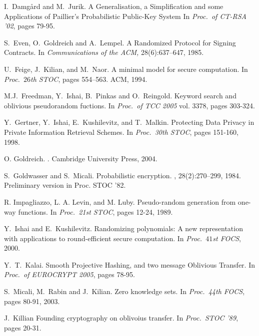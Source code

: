 \documentclass{article}
\begin{document}
\begin{footnotesize}
\begin{thebibliography}{10}
		I.~Damg{\aa}rd and M.~Jurik.
		\newblock A Generalisation, a Simplification and some Applications of Paillier's Probabilistic Public-Key System
		\newblock In {\em Proc.\ of CT-RSA '02}, pages 79-95.
		
		S.~Even, O.~Goldreich and A.~Lempel.
		\newblock A Randomized Protocol for Signing Contracts.
		\newblock In {\em Communications of the ACM,} 28(6):637--647, 1985.
		
		U.~Feige, J.~Kilian, and M.~Naor.
		\newblock A minimal model for secure computation.
		\newblock In {\em Proc.\ $26$th STOC}, pages 554--563. ACM, 1994.
		
		M.J.~Freedman, Y.~Ishai, B.~Pinkas and O.~Reingold.
		\newblock Keyword search and oblivious pseudorandom fuctions.
		\newblock In {\em Proc.\ of TCC 2005} vol. 3378, pages 303-324.
		
		Y.~Gertner, Y.~Ishai, E.~Kushilevitz, and T.~Malkin.
		\newblock Protecting Data Privacy in Private Information Retrieval Schemes.
		\newblock In {\em Proc.\ 30th STOC}, pages 151-160, 1998.
		
		
		 O. Goldreich.  .  \newblock Cambridge University
		Press, 2004.
		
		S.~Goldwasser and S.~Micali.
		\newblock Probabilistic encryption.
		, 28(2):270--299, 1984.
		\newblock Preliminary version in Proc. STOC '82.
		
		R. Impagliazzo, L. A. Levin, and M. Luby.
		\newblock Pseudo-random generation from one-way functions.
		\newblock In {\em Proc.\ 21st STOC}, pages 12-24, 1989.
		
		Y.~Ishai and E.~Kushilevitz.
		\newblock Randomizing polynomials: A new representation with applications to round-efficient secure computation.
		\newblock In {\em Proc.\ $41$st FOCS}, 2000.
		
		Y.~T.~Kalai.
		\newblock Smooth Projective Hashing, and two message Oblivious Transfer.
		\newblock In {\em Proc.\ of EUROCRYPT 2005}, pages 78-95.
		
		S.~Micali, M.~Rabin and J.~Kilian.
		\newblock Zero knowledge sets.
		\newblock In {\em Proc.\ 44th FOCS}, pages 80-91, 2003.
		
		J.~Killian
		\newblock Founding cryptography on oblivoius transfer.
		\newblock In {\em Proc.\ STOC '89}, pages 20-31.
		

\end{thebibliography}
\end{footnotesize}
\end{document}

